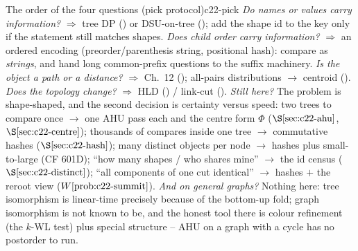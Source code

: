 \begin{definition}{The order of the four questions (pick protocol)}{c22-pick}
\emph{Do names or values carry information?} \(\Rightarrow\) tree DP
() or DSU-on-tree (); add the shape id to the key only if the
statement still matches shapes.  \emph{Does child order carry information?}
\(\Rightarrow\) an ordered encoding (preorder/parenthesis string, positional hash):
compare as \emph{strings}, and hand long common-prefix questions to the suffix
machinery.  \emph{Is the object a path or a distance?} \(\Rightarrow\) Ch.~12
(); all-pairs distributions \(\to\) centroid ().  \emph{Does
the topology change?} \(\Rightarrow\) HLD () / link-cut ().
\emph{Still here?} The problem is shape-shaped, and the second decision is
certainty versus speed: two trees to compare once \(\to\) one AHU pass each and the
centre form \(\Phi\) (\(\secref{c22-ahu}\), \(\secref{c22-centre}\)); thousands of
compares inside one tree \(\to\) commutative hashes (\(\secref{c22-hash}\)); many
distinct objects per node \(\to\) hashes plus small-to-large (CF 601D); ``how many
shapes / who shares mine'' \(\to\) the id census (\(\secref{c22-distinct}\)); ``all
components of one cut identical'' \(\to\) hashes \(+\) the reroot view
(\(\probref{c22-summit}\)).  \emph{And on general graphs?} Nothing here: tree
isomorphism is linear-time precisely because of the bottom-up fold; graph
isomorphism is not known to be, and the honest tool there is colour refinement
(the \(k\)-WL test) plus special structure -- AHU on a graph with a cycle has no
postorder to run.
\end{definition}

